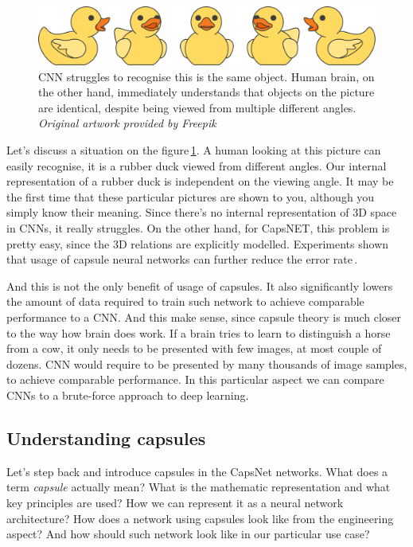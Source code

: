 \begin{figure}[ht]
    \centering
    \includegraphics[width=.8\textwidth]{obrazky-figures/duck.pdf}
    \caption{CNN struggles to recognise this is the same object. Human brain, on the other hand, immediately understands that objects on the picture are identical, despite being viewed from multiple different angles. \textit{Original artwork provided by Freepik\,\cite{freepik}}}
    \label{fig:duck}
\end{figure}

Let's discuss a situation on the figure\,\ref{fig:duck}. A human looking at this picture can easily recognise, it is a rubber duck viewed from different angles. Our internal representation of a rubber duck is independent on the viewing angle. It may be the first time that these particular pictures are shown to you, although you simply know their meaning. Since there's no internal representation of 3D space in CNNs, it really struggles. On the other hand, for CapsNET, this problem is pretty easy, since the 3D relations are explicitly modelled. Experiments shown that usage of capsule neural networks can further reduce the error rate\,\cite{capsule_compare}.

And this is not the only benefit of usage of capsules. It also significantly lowers the amount of data required to train such network to achieve comparable performance to a CNN. And this make sense, since capsule theory is much closer to the way how brain does work. If a brain tries to learn to distinguish a horse from a cow, it only needs to be presented with few images, at most couple of dozens. CNN would require to be presented by many thousands of image samples, to achieve comparable performance. In this particular aspect we can compare CNNs to a brute-force approach to deep learning.

\subsection{Understanding capsules}

Let's step back and introduce capsules in the CapsNet networks. What does a term \textit{capsule} actually mean? What is the mathematic representation and what key principles are used? How we can represent it as a neural network architecture? How does a network using capsules look like from the engineering aspect? And how should such network look like in our particular use case?


